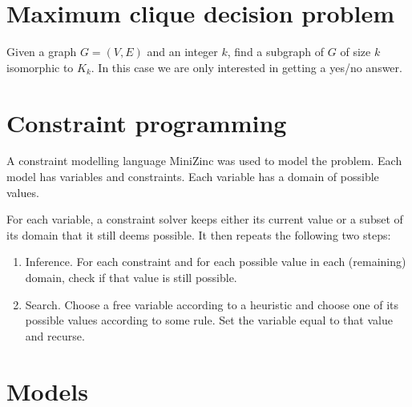 \documentclass{article}
\theoremstyle{definition}
\begin{document}
\section{Maximum clique decision problem}
Given a graph $G=(V,E)$ and an integer $k$, find a subgraph of $G$ of size $k$ isomorphic to $K_k$. In this case we are only interested in getting a yes/no answer.
\section{Constraint programming}
A constraint modelling language MiniZinc was used to model the problem. Each model has variables and constraints. Each variable has a domain of possible values.

For each variable, a constraint solver keeps either its current value or a subset of its domain that it still deems possible. It then repeats the following two steps:
\begin{enumerate}
\item Inference. For each constraint and for each possible value in each (remaining) domain, check if that value is still possible.
\item Search. Choose a free variable according to a heuristic and choose one of its possible values according to some rule. Set the variable equal to that value and recurse.
\end{enumerate}
\section{Models}
\end{document}
